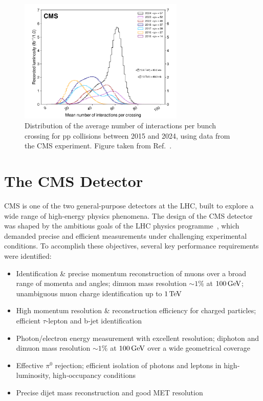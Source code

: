 \begin{figure}[!htbp]
\centering
\includegraphics[width= 0.7\textwidth]{Figures/Chapter3/CMS_Pileup.pdf}
\caption[Distribution of the average number of interactions per bunch crossing for pp collisions at CMS between 2015 and 2024]{Distribution of the average number of interactions per bunch crossing for pp collisions between 2015 and 2024, using data from the \ac{CMS} experiment. Figure taken from Ref.~\cite{CMS_IntegratedLumi}.}
\label{Figure:Chapter3_CMS_Pileup}
\end{figure}

\section{The CMS Detector}
\label{Section:Chapter3_CMS_Detector_Introduction}
\ac{CMS} is one of the two general-purpose detectors at the \ac{LHC}, built to explore a wide range of high-energy physics phenomena. The design of the \ac{CMS} detector was shaped by the ambitious goals of the \ac{LHC} physics programme~\cite{LHC_CMS}, which demanded precise and efficient measurements under challenging experimental conditions. To accomplish these objectives, several key performance requirements were identified:

\begin{itemize}
  \item Identification \& precise momentum reconstruction of muons over a broad range of momenta and angles; dimuon mass resolution $\sim1\%$ at $100\,\text{Ge\hspace{-.08em}V}$; unambiguous muon charge identification up to $1\,\text{Te\hspace{-.08em}V}$
  \item High momentum resolution \& reconstruction efficiency for charged particles; efficient $\tau$-lepton and b‐jet identification
  \item Photon/electron energy measurement with excellent resolution; diphoton and dimuon mass resolution $\sim1\%$ at $100\,\text{Ge\hspace{-.08em}V}$ over a wide geometrical coverage
  \item Effective $\pi^0$ rejection; efficient isolation of photons and leptons in high‐luminosity, high‐occupancy conditions
  \item Precise dijet mass reconstruction and good \ac{MET} resolution
\end{itemize}

